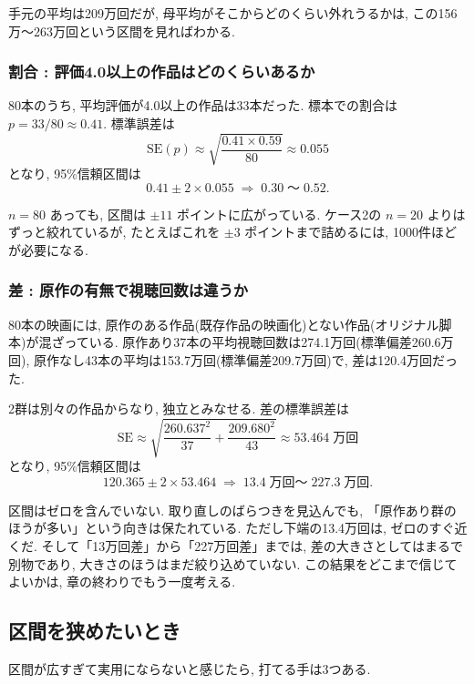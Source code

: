     手元の平均は209万回だが, 母平均がそこからどのくらい外れうるかは, この156万〜263万回という区間を見ればわかる.

    \subsubsection*{割合 : 評価4.0以上の作品はどのくらいあるか}

    80本のうち, 平均評価が4.0以上の作品は33本だった.
    標本での割合は $p = 33/80 \approx 0.41$.
    標準誤差は
    \[
      \mathrm{SE}(p) \approx \sqrt{\frac{0.41 \times 0.59}{80}} \approx 0.055
    \]
    となり, 95\%信頼区間は
    \[
      0.41 \pm 2 \times 0.055 \;\Rightarrow\; 0.30\;\text{〜}\;0.52.
    \]

    $n = 80$ あっても, 区間は $\pm 11$ ポイントに広がっている.
    ケース2の $n = 20$ よりはずっと絞れているが, たとえばこれを $\pm 3$ ポイントまで詰めるには, 1000件ほどが必要になる.

    \subsubsection*{差 : 原作の有無で視聴回数は違うか}

    80本の映画には, 原作のある作品(既存作品の映画化)とない作品(オリジナル脚本)が混ざっている.
    原作あり37本の平均視聴回数は274.1万回(標準偏差260.6万回), 原作なし43本の平均は153.7万回(標準偏差209.7万回)で, 差は120.4万回だった.

    2群は別々の作品からなり, 独立とみなせる.
    差の標準誤差は
    \[
      \mathrm{SE} \approx \sqrt{\frac{260.637^2}{37} + \frac{209.680^2}{43}} \approx 53.464\;\text{万回}
    \]
    となり, 95\%信頼区間は
    \[
      120.365 \pm 2 \times 53.464 \;\Rightarrow\; 13.4\;\text{万回〜}\;227.3\;\text{万回}.
    \]

    区間はゼロを含んでいない.
    取り直しのばらつきを見込んでも, 「原作あり群のほうが多い」という向きは保たれている.
    ただし下端の13.4万回は, ゼロのすぐ近くだ.
    そして「13万回差」から「227万回差」までは, 差の大きさとしてはまるで別物であり, 大きさのほうはまだ絞り込めていない.
    この結果をどこまで信じてよいかは, 章の終わりでもう一度考える.

  \subsection{区間を狭めたいとき}

    区間が広すぎて実用にならないと感じたら, 打てる手は3つある.

